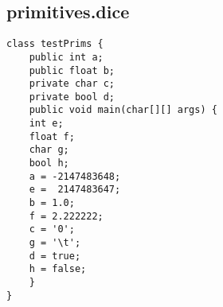 \subsection{primitives.dice}
\begin{verbatim}
class testPrims {
	public int a;
	public float b;
	private char c;
	private bool d;
	public void main(char[][] args) {
	int e;
	float f;
	char g;
	bool h;
	a = -2147483648;
	e =  2147483647;
	b = 1.0;
	f = 2.222222;
	c = '0';
	g = '\t';
	d = true;
	h = false;
	}
}
\end{verbatim}